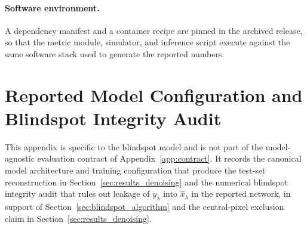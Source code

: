 \documentclass[twocolumn]{aastex7}
\newcounter{algorithm}
\begin{document}
\paragraph{Software environment.}
A dependency manifest and a container recipe are pinned in the archived release, so that the metric module, simulator, and inference script execute against the same software stack used to generate the reported numbers.

\section{Reported Model Configuration and Blindspot Integrity Audit}
\label{app:architecture_integrity}

This appendix is specific to the blindspot model and is not part of the model-agnostic evaluation contract of Appendix~\ref{app:contract}. It records the canonical model architecture and training configuration that produce the test-set reconstruction in Section~\ref{sec:results_denoising} and the numerical blindspot integrity audit that rules out leakage of $y_{\lambda}$ into $\hat{x}_{\lambda}$ in the reported network, in support of Section~\ref{sec:blindspot_algorithm} and the central-pixel exclusion claim in Section~\ref{sec:results_denoising}.

\end{document}
